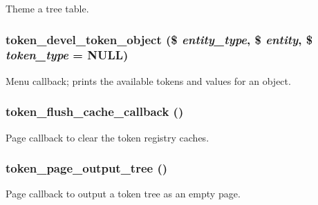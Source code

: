 \label{token_8pages_8inc_a27af1c0cde4fa8fd2b1ac04f516e2ca6}
Theme a tree table. \hypertarget{token_8pages_8inc_a2bdee1bca10e805d74679a6e50c6c7d8}{
\subsubsection[{token\_\-devel\_\-token\_\-object}]{\setlength{\rightskip}{0pt plus 5cm}token\_\-devel\_\-token\_\-object (\$ {\em entity\_\-type}, \/  \$ {\em entity}, \/  \$ {\em token\_\-type} = {\ttfamily NULL})}}
\label{token_8pages_8inc_a2bdee1bca10e805d74679a6e50c6c7d8}
Menu callback; prints the available tokens and values for an object. \hypertarget{token_8pages_8inc_ad77cea030ce3c4aa50e43d5b93d91908}{
\subsubsection[{token\_\-flush\_\-cache\_\-callback}]{\setlength{\rightskip}{0pt plus 5cm}token\_\-flush\_\-cache\_\-callback ()}}
\label{token_8pages_8inc_ad77cea030ce3c4aa50e43d5b93d91908}
Page callback to clear the token registry caches. \hypertarget{token_8pages_8inc_ac61826267ce539194039a1e0d1b1c85d}{
\subsubsection[{token\_\-page\_\-output\_\-tree}]{\setlength{\rightskip}{0pt plus 5cm}token\_\-page\_\-output\_\-tree ()}}
\label{token_8pages_8inc_ac61826267ce539194039a1e0d1b1c85d}
Page callback to output a token tree as an empty page. 